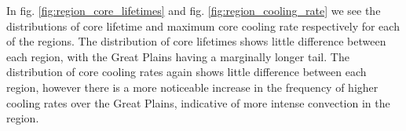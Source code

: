 

In fig. \ref{fig:region_core_lifetimes} and fig. \ref{fig:region_cooling_rate} we see the distributions of core lifetime and maximum core cooling rate respectively for each of the regions.
The distribution of core lifetimes shows little difference between each region, with the Great Plains having a marginally longer tail.
The distribution of core cooling rates again shows little difference between each region, however there is a more noticeable increase in the frequency of higher cooling rates over the Great Plains, indicative of more intense convection in the region.








